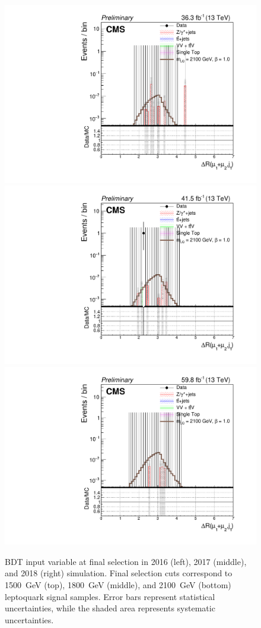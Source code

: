 \begin{figure}[H]
    {\includegraphics[width=.32\textwidth]{Images/Analysis/Results_2016_Unblinded/Plots/Final_selection/BasicLQ_uujj_DR_dimuonjet1_final2100.pdf}}
    {\includegraphics[width=.32\textwidth]{Images/Analysis/Results_2017_Unblinded/Plots/Final_selection/BasicLQ_uujj_DR_dimuonjet1_final2100.pdf}}
    {\includegraphics[width=.32\textwidth]{Images/Analysis/Results_2018_Unblinded/Plots/Final_selection/BasicLQ_uujj_DR_dimuonjet1_final2100.pdf}}
    \caption{BDT input variable \DRof{\Muu}{\PjOne} at final selection in 2016 (left), 2017 (middle), and 2018 (right) simulation. Final selection cuts correspond to \SI{1500}{GeV} (top), \SI{1800}{GeV} (middle), and \SI{2100}{GeV} (bottom) leptoquark signal samples. Error bars represent statistical uncertainties, while the shaded area represents systematic uncertainties.
    \label{figapp:finalSelDRuuj1}}
\end{figure}

